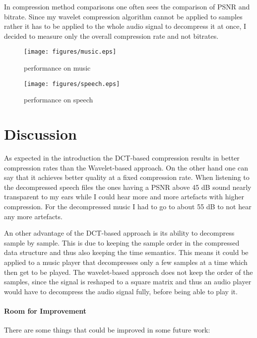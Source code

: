 \documentclass[a4paper]{scrartcl}
\begin{document}
In compression method comparisons one often sees the comparison of PSNR and
bitrate. Since my wavelet compression algorithm cannot be applied to samples
rather it has to be applied to the whole audio signal to decompress it
at once, I decided to measure only the overall compression rate and not bitrates.

\begin{figure}[h!]
\centering
\begin{minipage}{0.5\textwidth}
\centering
\texttt{[image: figures/music.eps]}
\caption{performance on music}
\label{fig:music_performance}
\end{minipage}\hfill
\begin{minipage}{0.5\textwidth}
\centering
\texttt{[image: figures/speech.eps]}
\caption{performance on speech}
\label{fig:speech_performance}
\end{minipage}
\end{figure}
\section{Discussion} As expected in the introduction the DCT-based compression
results in better compression rates than the Wavelet-based approach. On the
other hand one can say that it achieves better quality at a fixed compression
rate. When listening to the decompressed speech files the ones having a PSNR
above 45 dB sound nearly transparent to my ears while I could hear more and more
artefacts with higher compression. For the decompressed music I had to go to
about 55 dB to not hear any more artefacts.

An other advantage of the DCT-based approach is its ability to decompress sample
by sample. This is due to keeping the sample order in the compressed data
structure and thus also keeping the time semantics. This means it could be
applied to a music player that decompresses only a few samples at a time which
then get to be played. The wavelet-based approach does not keep the order of the
samples, since the signal is reshaped to a square matrix and thus an audio
player would have to decompress the audio signal fully, before being able to
play it.

\paragraph{Room for Improvement} There are some things that could be improved in
some future work:
\end{document}

